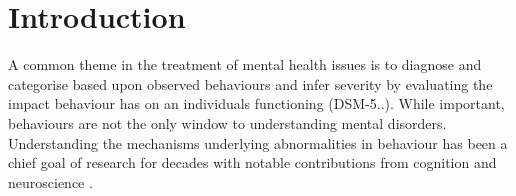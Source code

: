 \section{Introduction}

A common theme in the treatment of mental health issues is to diagnose and categorise based upon observed behaviours and infer severity by evaluating the impact behaviour has on an individuals functioning (DSM-5..). While important, behaviours are not the only window to understanding mental disorders. Understanding the mechanisms underlying abnormalities in behaviour has been a chief goal of research for decades with notable contributions from cognition and neuroscience \cite{Frank_2015}. 